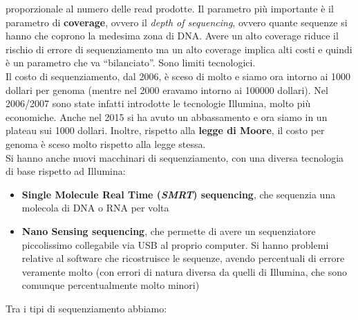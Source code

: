 \documentclass[a4paper,12pt, oneside]{book}
\begin{document}
proporzionale al numero delle read prodotte. Il parametro più importante è il
parametro di \textbf{coverage}, ovvero il \textit{depth of sequencing}, ovvero
quante sequenze si hanno che coprono la medesima zona di DNA. Avere un alto
coverage riduce il rischio di errore di sequenziamento ma un alto coverage
implica alti costi e quindi è un parametro che va ``bilanciato''. Sono limiti
tecnologici.\\ 
Il costo di sequenziamento, dal 2006, è sceso di molto e siamo ora intorno ai
1000 dollari per genoma (mentre nel 2000 eravamo intorno ai 100000 dollari). Nel
2006/2007 sono state infatti introdotte le tecnologie Illumina, molto più
economiche. Anche nel 2015 si ha avuto un abbassamento e ora siamo in un
plateau sui 1000 dollari. Inoltre, rispetto alla \textbf{legge di Moore}, il
costo per genoma è sceso molto rispetto alla legge stessa.\\
Si hanno anche nuovi macchinari di sequenziamento, con una diversa tecnologia di
base rispetto ad Illumina:
\begin{itemize}
  \item \textbf{Single Molecule Real Time (\textit{SMRT}) sequencing}, che
  sequenzia una molecola di DNA o RNA per volta
  \item \textbf{Nano Sensing sequencing}, che permette di avere un sequenziatore
  piccolissimo collegabile via USB al proprio computer. Si hanno problemi
  relative al software che ricostruisce le sequenze, avendo percentuali di
  errore veramente molto (con errori di natura diversa da quelli di Illumina,
  che sono comunque percentualmente molto minori)
\end{itemize}
Tra i tipi di sequenziamento abbiamo:
\end{document}
